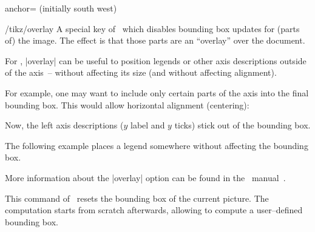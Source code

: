 \begin{pgfplotskey}{anchor= (initially south west)}
\begin{minipage}
\begin{tabular}
\begin{key}{/tikz/overlay}
	A special key of \PGF\ which disables bounding box updates for (parts of) the image. The effect is that those parts are an ``overlay'' over the document.

	For \PGFPlots, |overlay| can be useful to position legends or other axis descriptions outside of the axis~-- without affecting its size (and without affecting alignment).

For example, one may want to include only certain parts of the axis into the final bounding box. This would allow horizontal alignment (centering):
\begin{codeexample}[]
%
\end{codeexample}
\noindent Now, the left axis descriptions ($y$ label and $y$ ticks) stick out of the bounding box.
	
The following example places a legend somewhere without affecting the bounding box.
\begin{codeexample}[]
\end{codeexample}

	More information about the |overlay| option can be found in the \PGF\ manual~\cite{tikz}.
\end{key}

\begin{command}{\pgfresetboundingbox}
	This command of \pgfname\ resets the bounding box of the current picture. The computation starts from scratch afterwards, allowing to compute a user--defined bounding box.
	

\end{command}
\end{tabular}
\end{minipage}
\end{pgfplotskey}

